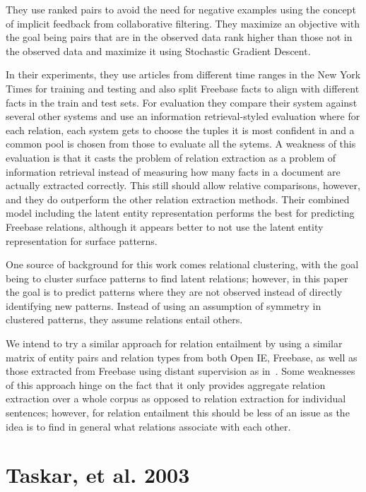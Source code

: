 \documentclass{article}
\begin{document}
They use ranked pairs to avoid the need for negative examples using the concept of implicit feedback from collaborative filtering. They maximize an objective with the goal being pairs that are in the observed data rank higher than those not in the observed data and maximize it using Stochastic Gradient Descent.

In their experiments, they use articles from different time ranges in the New York Times for training and testing and also split Freebase facts to align with different facts in the train and test sets. For evaluation they compare their system against several other systems and use an information retrieval-styled evaluation where for each relation, each system gets to choose the tuples it is most confident in and a common pool is chosen from those to evaluate all the sytems. A weakness of this evaluation is that it casts the problem of relation extraction as a problem of information retrieval instead of measuring how many facts in a document are actually extracted correctly. This still should allow relative comparisons, however, and they do outperform the other relation extraction methods. Their combined model including the latent entity representation performs the best for predicting Freebase relations, although it appears better to not use the latent entity representation for surface patterns.

One source of background for this work comes relational clustering, with the goal being to cluster surface patterns to find latent relations; however, in this paper the goal is to predict patterns where they are not observed instead of directly identifying new patterns. Instead of using an assumption of symmetry in clustered patterns, they assume relations entail others.

We intend to try a similar approach for relation entailment by using a similar matrix of entity pairs and relation types from both Open IE, Freebase, as well as those extracted from Freebase using distant supervision as in~\cite{HoffmannZLZW11}. Some weaknesses of this approach hinge on the fact that it only provides aggregate relation extraction over a whole corpus as opposed to relation extraction for individual sentences; however, for relation entailment this should be less of an issue as the idea is to find in general what relations associate with each other.

\section*{Taskar, et al. 2003}
\end{document}
